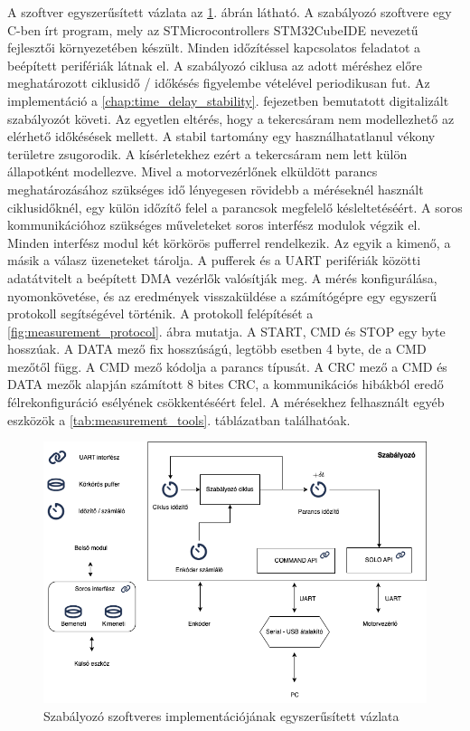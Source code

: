 A szoftver egyszerűsített vázlata az \ref{fig:block_diagram_control_software}. ábrán látható. 
A szabályozó szoftvere egy C-ben írt program, mely az STMicrocontrollers STM32CubeIDE nevezetű 
fejlesztői környezetében készült. Minden időzítéssel kapcsolatos feladatot a beépített perifériák 
látnak el. A szabályozó ciklusa az adott méréshez előre meghatározott ciklusidő / időkésés figyelembe 
vételével periodikusan fut. Az implementáció a \ref{chap:time_delay_stability}. fejezetben bemutatott 
digitalizált szabályozót követi. Az egyetlen eltérés, hogy a tekercsáram nem modellezhető az elérhető 
időkésések mellett. A stabil tartomány egy használhatatlanul vékony területre zsugorodik. A kísérletekhez ezért 
a tekercsáram nem lett külön állapotként modellezve. Mivel a motorvezérlőnek elküldött parancs meghatározásához szükséges idő 
lényegesen rövidebb a méréseknél használt ciklusidőknél, egy külön időzítő felel a parancsok 
megfelelő késleltetéséért. A soros kommunikációhoz szükséges műveleteket soros interfész modulok 
végzik el. Minden interfész modul két körkörös pufferrel rendelkezik. Az egyik a kimenő, a másik 
a válasz üzeneteket tárolja. A pufferek és a UART perifériák közötti adatátvitelt a beépített DMA vezérlők 
valósítják meg. A mérés konfigurálása, nyomonkövetése, és az eredmények visszaküldése a számítógépre 
egy egyszerű protokoll segítségével történik. A protokoll felépítését a \ref{fig:measurement_protocol}. ábra 
mutatja. 
A START, CMD és STOP egy byte hosszúak. A DATA mező fix hosszúságú, legtöbb esetben 4 byte, de a CMD mezőtől függ.
A CMD mező kódolja a parancs típusát. A CRC mező a CMD és DATA mezők alapján számított 8 bites CRC, a kommunikációs 
hibákból eredő félrekonfiguráció esélyének csökkentéséért felel. 
A mérésekhez felhasznált egyéb eszközök a \ref{tab:measurement_tools}. táblázatban találhatóak.

\begin{figure}[t]
	\begin{center}
		\includegraphics[width=14cm]{images/impedance_controler_software_diagram.png}
		\caption{Szabályozó szoftveres implementációjának egyszerűsített vázlata}\label{fig:block_diagram_control_software}
	\end{center}
\end{figure}


